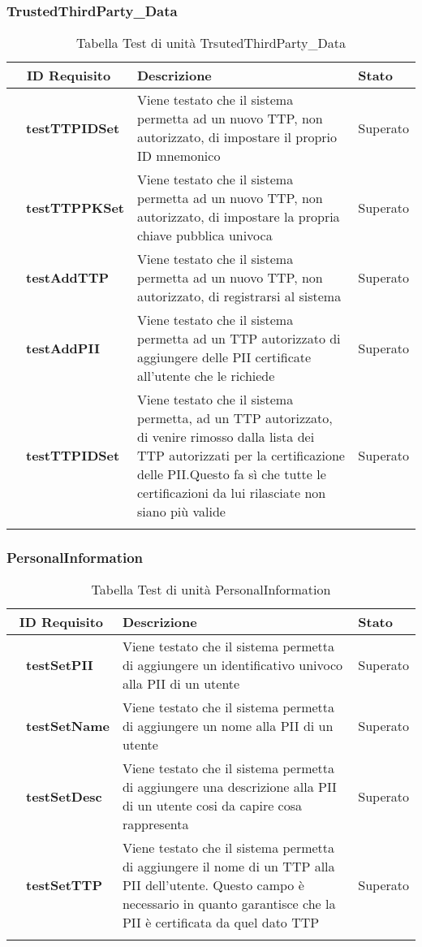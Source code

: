 \subsubsection{TrustedThirdParty\_Data}
\begin{longtable}{|r l|p{10cm}|p{2cm}|}
	\hline
	\multicolumn{2}{|c|}{\textbf{ID Requisito}} & \textbf{Descrizione} & \textbf{Stato}\tabularnewline
	\hline
	&\textbf{testTTPIDSet}&Viene testato che il sistema permetta ad un nuovo \gls{TTP}, non autorizzato, di impostare il proprio ID mnemonico & Superato\\\hline
	&\textbf{testTTPPKSet}&Viene testato che il sistema permetta ad un nuovo \gls{TTP}, non autorizzato, di impostare la propria chiave pubblica univoca & Superato\\\hline
	&\textbf{testAddTTP}&Viene testato che il sistema permetta ad un nuovo TTP, non autorizzato, di registrarsi al sistema& Superato\\\hline
	&\textbf{testAddPII}&Viene testato che il sistema permetta ad un \gls{TTP} autorizzato di aggiungere delle \gls{PII} certificate all'utente che le richiede& Superato\\\hline
	&\textbf{testTTPIDSet}&Viene testato che il sistema permetta, ad un \gls{TTP} autorizzato, di venire rimosso dalla lista dei \gls{TTP} autorizzati per la certificazione delle \gls{PII}.Questo fa sì che tutte le certificazioni da lui rilasciate non siano più valide& Superato\\\hline
	\caption{Tabella Test di unità TrsutedThirdParty\_Data}
\end{longtable}
\subsubsection{PersonalInformation}
\begin{longtable}{|r l|p{10cm}|p{2cm}|}
	\hline
	\multicolumn{2}{|c|}{\textbf{ID Requisito}} & \textbf{Descrizione} & \textbf{Stato}\tabularnewline
	\hline
	&\textbf{testSetPII}&Viene testato che il sistema permetta di aggiungere un identificativo univoco alla \gls{PII} di un utente& Superato\\\hline
	&\textbf{testSetName}&Viene testato che il sistema permetta di aggiungere un nome alla \gls{PII} di un utente& Superato\\\hline
	&\textbf{testSetDesc}&Viene testato che il sistema permetta di aggiungere una descrizione alla \gls{PII} di un utente cosi da capire cosa rappresenta& Superato\\\hline
	&\textbf{testSetTTP}&Viene testato che il sistema permetta di aggiungere il nome di un \gls{TTP} alla \gls{PII} dell'utente. Questo campo è necessario in quanto garantisce che la \gls{PII} è certificata da quel dato \gls{TTP}& Superato\\\hline
	\caption{Tabella Test di unità PersonalInformation}
\end{longtable}
